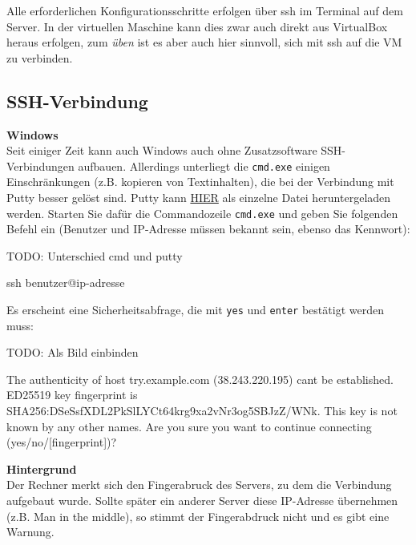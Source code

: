 \documentclass[
  letterpaper,
  DIV=11]{scrreprt}
\newenvironment{Shaded}{\begin{snugshade}}{\end{snugshade}}
\newcommand{\ExtensionTok}[1]{\textcolor[rgb]{0.00,0.23,0.31}{#1}}
\newcommand{\FunctionTok}[1]{\textcolor[rgb]{0.28,0.35,0.67}{#1}}
\newcommand{\NormalTok}[1]{\textcolor[rgb]{0.00,0.23,0.31}{#1}}
\newcommand{\StringTok}[1]{\textcolor[rgb]{0.13,0.47,0.30}{#1}}
\begin{document}
Alle erforderlichen Konfigurationsschritte erfolgen über ssh im Terminal
auf dem Server. In der virtuellen Maschine kann dies zwar auch direkt
aus VirtualBox heraus erfolgen, zum \emph{üben} ist es aber auch hier
sinnvoll, sich mit ssh auf die VM zu verbinden.

\subsection{SSH-Verbindung}\label{ssh-verbindung}

\textbf{Windows}\\
Seit einiger Zeit kann auch Windows auch ohne Zusatzsoftware
SSH-Verbindungen aufbauen. Allerdings unterliegt die \texttt{cmd.exe}
einigen Einschränkungen (z.B. kopieren von Textinhalten), die bei der
Verbindung mit Putty besser gelöst sind. Putty kann \href{TODO}{HIER}
als einzelne Datei heruntergeladen werden. Starten Sie dafür die
Commandozeile \texttt{cmd.exe} und geben Sie folgenden Befehl ein
(Benutzer und IP-Adresse müssen bekannt sein, ebenso das Kennwort):

TODO: Unterschied cmd und putty

\begin{Shaded}
\begin{Highlighting}[]
\FunctionTok{ssh}\NormalTok{ benutzer@ip{-}adresse }
\end{Highlighting}
\end{Shaded}

Es erscheint eine Sicherheitsabfrage, die mit \texttt{yes} und
\texttt{enter} bestätigt werden muss:

TODO: Als Bild einbinden

\begin{Shaded}
\begin{Highlighting}[]
\ExtensionTok{The}\NormalTok{ authenticity of host }\StringTok{\textquotesingle{}try.example.com (38.243.220.195)\textquotesingle{}}\NormalTok{ can}\StringTok{\textquotesingle{}t be established.}
\StringTok{ED25519 key fingerprint is SHA256:DSeSsfXDL2PkSlLYCt64krg9xa2vNr3og5SBJzZ/WNk.}
\StringTok{This key is not known by any other names.}
\StringTok{Are you sure you want to continue connecting (yes/no/[fingerprint])?}
\end{Highlighting}
\end{Shaded}

\samplestart

\textbf{Hintergrund}\\
Der Rechner merkt sich den Fingerabruck des Servers, zu dem die
Verbindung aufgebaut wurde. Sollte später ein anderer Server diese
IP-Adresse übernehmen (z.B. Man in the middle), so stimmt der
Fingerabdruck nicht und es gibt eine Warnung. \sampleend
\end{document}
